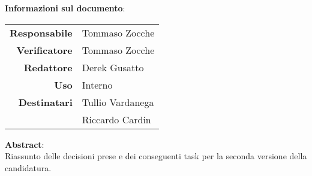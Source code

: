 \begin{center}
\textbf{Informazioni sul documento}: \\
\vspace{0.5cm}

\begin{tabular}{r|l}
    \textbf{Responsabile} & Tommaso Zocche \\ 
    \textbf{Verificatore} & Tommaso Zocche \\ 
    \textbf{Redattore} & Derek Gusatto \\ 
    \textbf{Uso} & Interno \\ 
    \textbf{Destinatari} & Tullio Vardanega \\ & Riccardo Cardin \\ 
\end{tabular}

\vfill

\textbf{Abstract}: \\
\vspace{0.5cm}
Riassunto delle decisioni prese e dei conseguenti task per la seconda versione della candidatura.
\end{center}


\bigskip